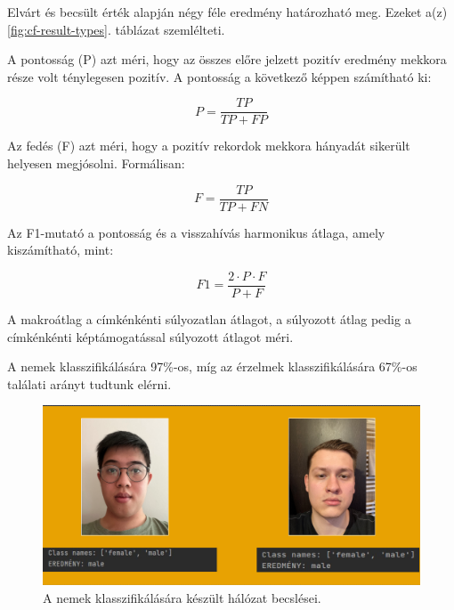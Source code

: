 \documentclass[12pt,a4]{article}
\begin{document}
            
            Elvárt és becsült érték alapján négy féle eredmény határozható meg. Ezeket a(z) \ref{fig:cf-result-types}. táblázat szemlélteti. 
            
            A pontosság (P) azt méri, hogy az összes előre jelzett pozitív eredmény mekkora része volt ténylegesen pozitív. A pontosság a következő képpen számítható ki:

            \begin{equation}
                P = \frac{TP}{TP + FP}
            \end{equation}
            
            Az fedés (F) azt méri, hogy a pozitív rekordok mekkora hányadát sikerült helyesen megjósolni. Formálisan:

            \begin{equation}
                F = \frac{TP}{TP + FN}
            \end{equation}
            
            Az F1-mutató a pontosság és a visszahívás harmonikus átlaga, amely kiszámítható, mint:

            \begin{equation}
                F1 = \frac{2 \cdot P \cdot F}{P + F}
            \end{equation}
            
            A makroátlag a címkénkénti súlyozatlan átlagot, a súlyozott átlag pedig a címkénkénti képtámogatással súlyozott átlagot méri.            
        
            A nemek klasszifikálására 97\%-os, míg az érzelmek klasszifikálására 67\%-os találati arányt tudtunk elérni.
    
                \begin{figure}[h!]	
            		\centering
            		\includegraphics[width=1\linewidth]{gender}
                    \caption{  A nemek klasszifikálására készült hálózat becslései.}
                    \label{fig:gender}
            	\end{figure}
            
\end{document}
